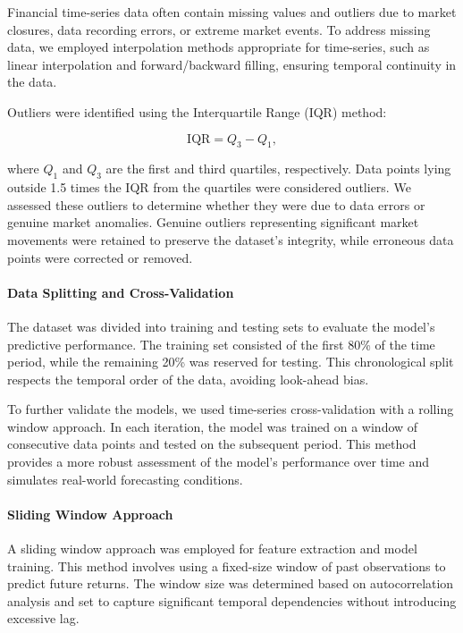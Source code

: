 Financial time-series data often contain missing values and outliers due to market closures, data recording errors, or extreme market events. To address missing data, we employed interpolation methods appropriate for time-series, such as linear interpolation and forward/backward filling, ensuring temporal continuity in the data.

Outliers were identified using the Interquartile Range (IQR) method:

\begin{equation}
    \text{IQR} = Q_3 - Q_1,
\end{equation}

where $Q_1$ and $Q_3$ are the first and third quartiles, respectively. Data points lying outside 1.5 times the IQR from the quartiles were considered outliers. We assessed these outliers to determine whether they were due to data errors or genuine market anomalies. Genuine outliers representing significant market movements were retained to preserve the dataset's integrity, while erroneous data points were corrected or removed.

\paragraph{Data Splitting and Cross-Validation}

The dataset was divided into training and testing sets to evaluate the model's predictive performance. The training set consisted of the first 80\% of the time period, while the remaining 20\% was reserved for testing. This chronological split respects the temporal order of the data, avoiding look-ahead bias.

To further validate the models, we used time-series cross-validation with a rolling window approach. In each iteration, the model was trained on a window of consecutive data points and tested on the subsequent period. This method provides a more robust assessment of the model's performance over time and simulates real-world forecasting conditions.

\paragraph{Sliding Window Approach}

A sliding window approach was employed for feature extraction and model training. This method involves using a fixed-size window of past observations to predict future returns. The window size was determined based on autocorrelation analysis and set to capture significant temporal dependencies without introducing excessive lag.

